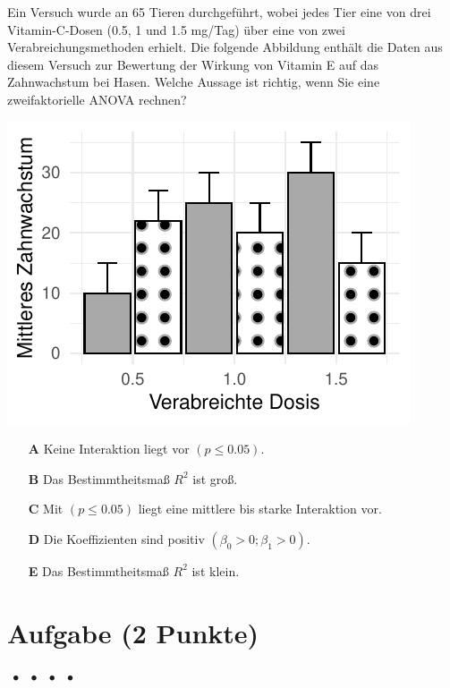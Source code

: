 \documentclass[a4paper, 9pt]{scrartcl}\usepackage[]{graphicx}\usepackage[]{xcolor}
\makeatletter
\def\maxwidth{ %
  \ifdim\Gin@nat@width>\linewidth
    \linewidth
  \else
    \Gin@nat@width
  \fi
}
\makeatother
\begin{document}
Ein Versuch wurde an 65 Tieren durchgeführt, wobei jedes Tier eine von drei Vitamin-C-Dosen (0.5, 1 und 1.5 mg/Tag) über eine von zwei Verabreichungsmethoden erhielt. Die folgende Abbildung enthält die Daten aus diesem Versuch zur Bewertung der Wirkung von Vitamin E auf das Zahnwachstum bei Hasen.  Welche Aussage ist richtig, wenn Sie eine zweifaktorielle ANOVA rechnen?



{\centering \includegraphics[width=\maxwidth]{img/mc-anova-02-a-1} 

}







\begin{enumerate}
\item [\textbf{A} \msquare] Keine Interaktion liegt vor $(p \leq 0.05)$.
\item [\textbf{B} \msquare] Das Bestimmtheitsmaß $R^2$ ist groß.
\item [\textbf{C} \msquare] Mit $(p \leq 0.05)$ liegt eine mittlere bis starke Interaktion vor.
\item [\textbf{D} \msquare] Die Koeffizienten sind positiv $(\beta_0 > 0; \beta_1 > 0)$.
\item [\textbf{E} \msquare] Das Bestimmtheitsmaß $R^2$ ist klein.
\end{enumerate} 

\section{Aufgabe \hfill (2 Punkte)}

\ifcollection
\begin{flushright}
\tiny\vspace{-2Ex}
\textbf{\examinhaltstart}
\exammodulemathstat $\;\bullet$
\exammodulestat $\;\bullet$
\exammodulestatbbv $\;\bullet$
\exammodulestatversuch $\;\bullet$
\exammodulebiostat
\vspace{-1Ex}
\end{flushright}
\fi
\end{document}
